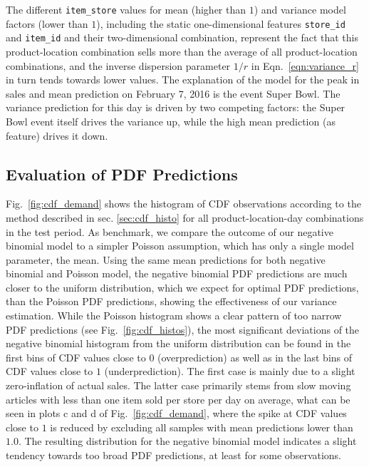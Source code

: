 \documentclass[BCOR=1mm, DIV=calc,10pt,
twoside=true,
twocolumn,
headings=normal]{scrartcl}
\newcommand{\fig}{Fig.~}
\newcommand{\eqn}{Eqn.~}
\begin{document}
\noindent
The different \texttt{item\_store} values for mean (higher than $1$) and variance model factors (lower than $1$), including the static one-dimensional features \texttt{store\_id} and \texttt{item\_id} and their two-dimensional combination, represent the fact that this product-location combination sells more than the average of all product-location combinations, and the inverse dispersion parameter $1/r$ in \eqn \eqref{eqn:variance_r} in turn tends towards lower values. The explanation of the model for the peak in sales and mean prediction on February 7, 2016 is the event Super Bowl. The variance prediction for this day is driven by two competing factors: the Super Bowl event itself drives the variance up, while the high mean prediction (as feature) drives it down.

\subsection{Evaluation of PDF Predictions}

\fig \ref{fig:cdf_demand} shows the histogram of CDF observations according to the method described in sec. \ref{sec:cdf_histo} for all product-location-day combinations in the test period. As benchmark, we compare the outcome of our negative binomial model to a simpler Poisson assumption, which has only a single model parameter, the mean. Using the same mean predictions for both negative binomial and Poisson model, the negative binomial PDF predictions are much closer to the uniform distribution, which we expect for optimal PDF predictions, than the Poisson PDF predictions, showing the effectiveness of our variance estimation. While the Poisson histogram shows a clear pattern of too narrow PDF predictions (see \fig \ref{fig:cdf_histos}), the most significant deviations of the negative binomial histogram from the uniform distribution can be found in the first bins of CDF values close to $0$ (overprediction) as well as in the last bins of CDF values close to $1$ (underprediction). The first case is mainly due to a slight zero-inflation of actual sales. The latter case primarily stems from slow moving articles with less than one item sold per store per day on average, what can be seen in plots c and d of \fig \ref{fig:cdf_demand}, where the spike at CDF values close to $1$ is reduced by excluding all samples with mean predictions lower than $1.0$. The resulting distribution for the negative binomial model indicates a slight tendency towards too broad PDF predictions, at least for some observations.
\end{document}

